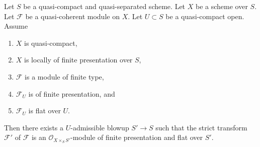 \begin{theorem}
\label{theorem-flatten-module}
Let $S$ be a quasi-compact and quasi-separated scheme.
Let $X$ be a scheme over $S$.
Let $\mathcal{F}$ be a quasi-coherent module on $X$.
Let $U \subset S$ be a quasi-compact open. Assume
\begin{enumerate}
\item $X$ is quasi-compact,
\item $X$ is locally of finite presentation over $S$,
\item $\mathcal{F}$ is a module of finite type,
\item $\mathcal{F}_U$ is of finite presentation, and
\item $\mathcal{F}_U$ is flat over $U$.
\end{enumerate}
Then there exists a $U$-admissible blowup $S' \to S$ such that the
strict transform $\mathcal{F}'$ of $\mathcal{F}$ is an
$\mathcal{O}_{X \times_S S'}$-module of finite presentation and
flat over $S'$.
\end{theorem}

